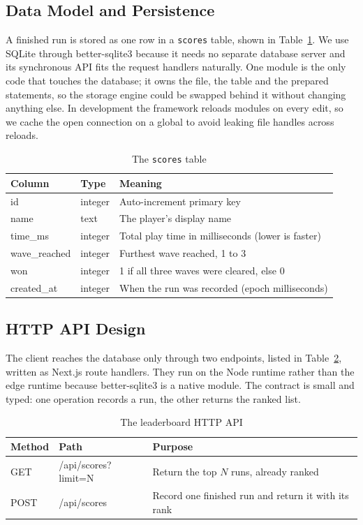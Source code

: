 \documentclass[12pt,a4paper]{report}
\begin{document}
\subsection{Data Model and Persistence}

A finished run is stored as one row in a \texttt{scores} table, shown in
Table~\ref{tab:schema}. We use SQLite through better-sqlite3 because it needs no
separate database server and its synchronous API fits the request handlers
naturally. One module is the only code that touches the database; it owns the
file, the table and the prepared statements, so the storage engine could be
swapped behind it without changing anything else. In development the framework
reloads modules on every edit, so we cache the open connection on a global to
avoid leaking file handles across reloads.

\begin{table}[htbp]
\centering
\caption{The \texttt{scores} table}
\label{tab:schema}
\begin{tabular}{|p{3.4cm}|p{2.6cm}|p{6.0cm}|}
\hline
Column & Type & Meaning \\
\hline
id & integer & Auto-increment primary key \\
\hline
name & text & The player's display name \\
\hline
time\_ms & integer & Total play time in milliseconds (lower is faster) \\
\hline
wave\_reached & integer & Furthest wave reached, 1 to 3 \\
\hline
won & integer & 1 if all three waves were cleared, else 0 \\
\hline
created\_at & integer & When the run was recorded (epoch milliseconds) \\
\hline
\end{tabular}
\end{table}

\subsection{HTTP API Design}

The client reaches the database only through two endpoints, listed in
Table~\ref{tab:api}, written as Next.js route handlers. They run on the Node
runtime rather than the edge runtime because better-sqlite3 is a native module.
The contract is small and typed: one operation records a run, the other returns
the ranked list.

\begin{table}[htbp]
\centering
\caption{The leaderboard HTTP API}
\label{tab:api}
\begin{tabular}{|p{1.4cm}|p{3.2cm}|p{7.4cm}|}
\hline
Method & Path & Purpose \\
\hline
GET & /api/scores?limit=N & Return the top $N$ runs, already ranked \\
\hline
POST & /api/scores & Record one finished run and return it with its rank \\
\hline
\end{tabular}
\end{table}
\end{document}
